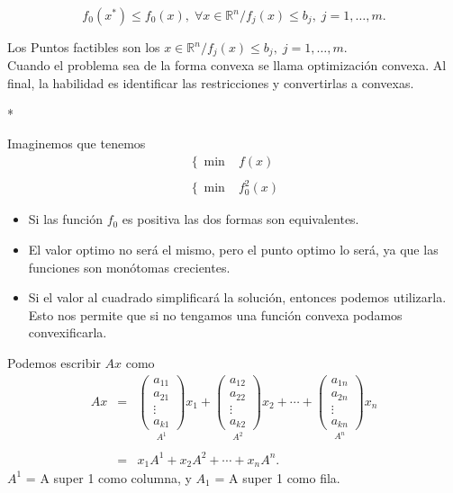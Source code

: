\begin{paracol}{2}
	    $$f_0(x^*)\leq f_0(x), \;\forall x\in \mathbb{R}^n / f_j(x)\leq b_j,\; j=1,\ldots,m.$$

Los Puntos factibles son los $x\in \mathbb{R}^n / f_j(x)\leq b_j,\; j=1,\ldots,m.$\\

Cuando el problema sea de la forma convexa se llama optimización convexa. Al final, la habilidad es identificar las restricciones y convertirlas a convexas.

\switchcolumn[1]*{\scriptsize
\begin{nota} Imaginemos que tenemos
    $$
    \begin{array}{rl}
	\left\{\min\right. & f(x)\\\\
	\left\{ \min \right. & f_0^2(x)
    \end{array}
    $$
    \begin{itemize}
	\item Si las función $f_0$ es positiva las dos formas son equivalentes. 
	\item El valor optimo no será el mismo, pero el punto optimo lo será, ya que las funciones son monótomas crecientes. 
	\item Si el valor al cuadrado simplificará la solución, entonces podemos utilizarla. Esto nos permite que si no tengamos una función convexa podamos convexificarla.
    \end{itemize}
\end{nota}
}
\switchcolumn[0]\noindent
\begin{notacion}
    Podemos escribir $Ax$ como
    $$
    \begin{array}{rcl}
	Ax &=& 
	\underset{A^1}{
	\begin{pmatrix}
	    a_{11}\\
	    a_{21}\\
	    \vdots\\
	    a_{k1}
	\end{pmatrix}}
	x_1+
	\underset{A^2}{
	\begin{pmatrix}
		a_{12}\\
		a_{22}\\
		\vdots\\
		a_{k2}
	\end{pmatrix}}
	x_2+
	\cdots +
	\underset{A^n}{
	\begin{pmatrix}
		a_{1n}\\
		a_{2n}\\
		\vdots\\
		a_{kn}
	\end{pmatrix}}
	x_n\\\\
       &=&
	x_1A^1+x_2A^2+\cdots+x_nA^n.
    \end{array}
    $$
    $A^1$ = A super 1 como columna, y $A_1$ = A super 1 como fila.\\


\end{notacion}
\end{paracol}
